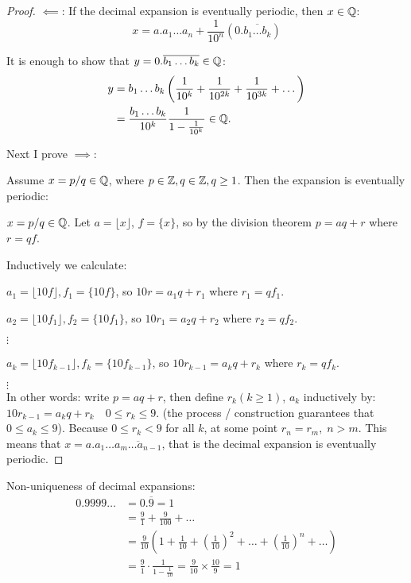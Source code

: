 \documentclass[twoside]{scrartcl}
\begin{document}
\begin{proof}
$\impliedby$: If the decimal expansion is eventually periodic, then $x\in\mathbb{Q}$:
\[x = a.a_1\dots a_n +\frac{1}{10^n}(0.\overline{b_1\dots b_k})\]

It is enough to show that $y = 0.\overline{b_1\dots b_k} \in\mathbb{Q}$:
\[
\begin{aligned}
  y &= b_1\dots b_k\left(\frac{1}{10^k} + \frac{1}{10^{2k}} + \frac{1}{10^{3k}} + \dots \right)\\
  &= \frac{b_1\dots b_k}{10^k} \frac{1}{1-\frac{1}{10^k}} \in \mathbb{Q}.
\end{aligned}
\]

Next I prove $\implies$:

 Assume $x = p/q \in\mathbb{Q}$, where $p \in\mathbb{Z}, q \in\mathbb{Z}, q \geq 1$. Then the expansion is eventually periodic: 

$x = p/q \in\mathbb{Q}$. Let $a = \lfloor x \rfloor$, $f = \{x\}$, so by the division theorem $p = aq + r$ where $r = qf$. 

Inductively we calculate: 

$a_1 = \lfloor 10f\rfloor, f_1 = \{10f\}$, so $10r = a_1q + r_1$ where $r_1 =qf_1$. 

$a_2 = \lfloor 10f_1\rfloor, f_2 = \{10f_1\}$, so $10r_1 = a_2q + r_2$ where $r_2 = qf_2$. 

\hspace*{5cm} $\vdots$

$a_k = \lfloor 10f_{k-1}\rfloor, f_k = \{10f_{k-1}\}$, so $10r_{k-1} = a_kq + r_k$ where $r_k = qf_k$. 

\hspace*{5cm} $\vdots$\\


In other words: write $p = aq + r$, then define $r_k (k \geq 1)$, $a_k$ inductively by: $10r_{k-1} = a_kq + r_k\quad 0 \leq r_k \leq 9$. 
(the process / construction guarantees that $0\leq a_k \leq 9$). Because $0 \leq r_k < 9$ for all $k$, at some point $r_n = r_m,\; n > m$. This means that $x = a.a_1 \dots \overline{a_m\dots a_{n-1}}$, that is the decimal expansion is eventually periodic. 
\end{proof}\vspace*{5pt}

Non-uniqueness of decimal expansions:  
\[
\begin{aligned}
  0.9999 \dots &= 0.\overline{9} = 1\\
  &= \frac{9}{1} + \frac{9}{100} + \dots \\
  &= \frac{9}{10}\left( 1 + \frac{1}{10} + \left(\frac{1}{10}\right)^2 + \dots + \left(\frac{1}{10}\right)^n + \dots \right)\\
  &= \frac{9}{1} \cdot \frac{1}{1 -\frac{1}{10}} = \frac{9}{10} \times \frac{10}{9} = 1
\end{aligned}
\]\vspace*{10pt}
\end{document}
